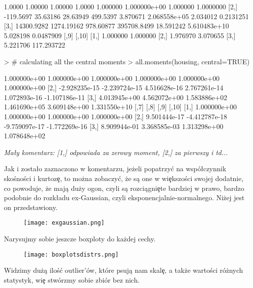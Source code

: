 \documentclass{article}
\begin{document}
\begin{Schunk}
\begin{Soutput}
[1,]     1.0000    1.00000   1.00000      1.0000  1.000000 1.000000e+00 1.000000 1.0000000
[2,]  -119.5697   35.63186  28.63949    499.5397  3.870671 2.068558e+05 2.034012 0.2131251
[3,] 14300.9282 1274.19162 978.60877 395708.8499 18.591242 5.610483e+10 5.028198 0.0487909
         [,9]      [,10]
[1,] 1.000000   1.000000
[2,] 1.976970   3.070655
[3,] 5.221706 117.293722
\end{Soutput}
\begin{Sinput}
> # calculating all the central moments
> all.moments(housing, central=TRUE)
\end{Sinput}
\begin{Soutput}
              [,1]          [,2]         [,3]         [,4]         [,5]          [,6]
[1,]  1.000000e+00  1.000000e+00 1.000000e+00 1.000000e+00 1.000000e+00  1.000000e+00
[2,] -2.928235e-15 -2.239724e-15 4.516628e-16 2.767261e-14 1.072893e-16 -1.107186e-11
[3,]  4.013945e+00  4.562072e+00 1.583886e+02 1.461690e+05 3.609148e+00  1.331550e+10
             [,7]          [,8]          [,9]         [,10]
[1,] 1.000000e+00  1.000000e+00  1.000000e+00  1.000000e+00
[2,] 9.501444e-17 -4.412787e-18 -9.759097e-17 -1.772269e-16
[3,] 8.909944e-01  3.368585e-03  1.313298e+00  1.078648e+02
\end{Soutput}
\end{Schunk}

\noindent
\quad \textit{Ma\l y komentarz: [1,] odpowiada za zerowy moment, [2,] za pierwszy i td...}

\noindent
\quad Jak i zosta\l o zaznaczono w komentarzu, jeżeli popatrzy\'c na wspó\l czynnik skośności i kurtoz\c e, to można zobaczy\'c, że są one w wi\c ekszości swojej dodatnie, co powoduje, że mają duży ogon, czyli są rozciągni\c ete bardziej w prawo, bardzo podobnie do rozk\l adu ex-Gaussian, czyli eksponencjalnie-normalnego. Niżej jest on przedstawiony.

\begin{figure}[h!]
\centering
\texttt{[image: exgaussian.png]}
\end{figure}

\noindent
\quad Narysujmy sobie jeszcze boxploty do każdej cechy.

\begin{figure}[h!]
\centering
\texttt{[image: boxplotsdistrs.png]}  %
\end{figure}

\noindent
\quad Widzimy dużą iloś\'c outlier'ów, które psują nam skal\c e, a także wartości różnych statystyk, wi\c e stwórzmy sobie zbiór bez nich.
\end{document}
